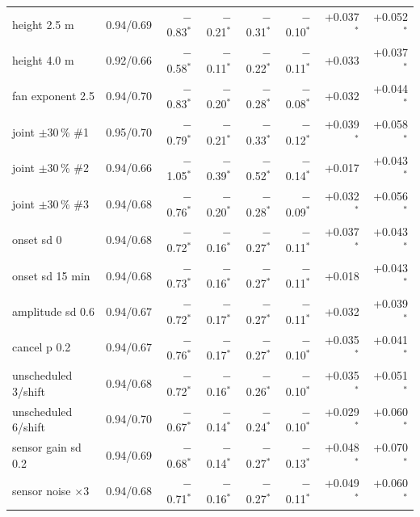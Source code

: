 \begin{tabular}{llrrrrrr}
height 2.5 m & 0.94/0.69 & \ensuremath{-}0.83$^*$ & \ensuremath{-}0.21$^*$ & \ensuremath{-}0.31$^*$ & \ensuremath{-}0.10$^*$ & +0.037$^*$ & +0.052$^*$\\
height 4.0 m & 0.92/0.66 & \ensuremath{-}0.58$^*$ & \ensuremath{-}0.11$^*$ & \ensuremath{-}0.22$^*$ & \ensuremath{-}0.11$^*$ & +0.033 & +0.037$^*$\\
fan exponent 2.5 & 0.94/0.70 & \ensuremath{-}0.83$^*$ & \ensuremath{-}0.20$^*$ & \ensuremath{-}0.28$^*$ & \ensuremath{-}0.08$^*$ & +0.032 & +0.044$^*$\\
joint $\pm$30\,\% \#1 & 0.95/0.70 & \ensuremath{-}0.79$^*$ & \ensuremath{-}0.21$^*$ & \ensuremath{-}0.33$^*$ & \ensuremath{-}0.12$^*$ & +0.039$^*$ & +0.058$^*$\\
joint $\pm$30\,\% \#2 & 0.94/0.66 & \ensuremath{-}1.05$^*$ & \ensuremath{-}0.39$^*$ & \ensuremath{-}0.52$^*$ & \ensuremath{-}0.14$^*$ & +0.017 & +0.043$^*$\\
joint $\pm$30\,\% \#3 & 0.94/0.68 & \ensuremath{-}0.76$^*$ & \ensuremath{-}0.20$^*$ & \ensuremath{-}0.28$^*$ & \ensuremath{-}0.09$^*$ & +0.032$^*$ & +0.056$^*$\\
onset sd 0 & 0.94/0.68 & \ensuremath{-}0.72$^*$ & \ensuremath{-}0.16$^*$ & \ensuremath{-}0.27$^*$ & \ensuremath{-}0.11$^*$ & +0.037$^*$ & +0.043$^*$\\
onset sd 15 min & 0.94/0.68 & \ensuremath{-}0.73$^*$ & \ensuremath{-}0.16$^*$ & \ensuremath{-}0.27$^*$ & \ensuremath{-}0.11$^*$ & +0.018 & +0.043$^*$\\
amplitude sd 0.6 & 0.94/0.67 & \ensuremath{-}0.72$^*$ & \ensuremath{-}0.17$^*$ & \ensuremath{-}0.27$^*$ & \ensuremath{-}0.11$^*$ & +0.032 & +0.039$^*$\\
cancel p 0.2 & 0.94/0.67 & \ensuremath{-}0.76$^*$ & \ensuremath{-}0.17$^*$ & \ensuremath{-}0.27$^*$ & \ensuremath{-}0.10$^*$ & +0.035$^*$ & +0.041$^*$\\
unscheduled 3/shift & 0.94/0.68 & \ensuremath{-}0.72$^*$ & \ensuremath{-}0.16$^*$ & \ensuremath{-}0.26$^*$ & \ensuremath{-}0.10$^*$ & +0.035$^*$ & +0.051$^*$\\
unscheduled 6/shift & 0.94/0.70 & \ensuremath{-}0.67$^*$ & \ensuremath{-}0.14$^*$ & \ensuremath{-}0.24$^*$ & \ensuremath{-}0.10$^*$ & +0.029$^*$ & +0.060$^*$\\
sensor gain sd 0.2 & 0.94/0.69 & \ensuremath{-}0.68$^*$ & \ensuremath{-}0.14$^*$ & \ensuremath{-}0.27$^*$ & \ensuremath{-}0.13$^*$ & +0.048$^*$ & +0.070$^*$\\
sensor noise $\times$3 & 0.94/0.68 & \ensuremath{-}0.71$^*$ & \ensuremath{-}0.16$^*$ & \ensuremath{-}0.27$^*$ & \ensuremath{-}0.11$^*$ & +0.049$^*$ & +0.060$^*$\\

\end{tabular}
